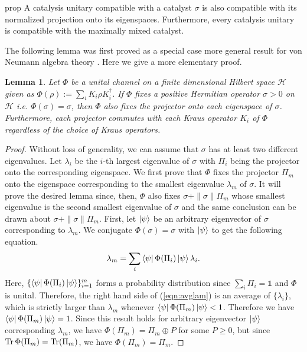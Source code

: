\documentclass[aps, reprint, amsmath,amssymb, prx, superscriptaddress]{revtex4-2}
\newtheorem{lemma}[theorem]{Lemma}
\begin{document}
\begin{theoremEnd}{prop} \label{prop:comp}
    A catalysis unitary compatible with a catalyst $\sigma$ is also compatible with its normalized projection onto its eigenspaces. Furthermore, every catalysis unitary is compatible with the maximally mixed catalyst.
\end{theoremEnd}
\begin{proofEnd}


 The following lemma was first proved as a special case more general result for von Neumann algebra theory \cite{arias2002fixed, lie2020uniform}. Here we give a more elementary proof.

\begin{lemma} \label{lem:unital}
Let $\Phi$ be a unital channel on a finite dimensional Hilbert space $\mathcal{H}$ given as $\Phi(\rho):=\sum_i K_i\rho K_i^\dag$. If $\Phi$ fixes a positive Hermitian operator $\sigma > 0$ on $\mathcal{H}$ i.e. $\Phi(\sigma)=\sigma$, then $\Phi$ also fixes the projector onto each eigenspace of $\sigma$. Furthermore, each projector commutes with each Kraus operator $K_i$ of $\Phi$ regardless of the choice of Kraus operators.
\end{lemma}
\begin{proof}
    Without loss of generality, we can assume that $\sigma$ has at least two different eigenvalues. Let $\lambda_i$ be the $i$-th largest eigenvalue of $\sigma$ with $\Pi_i$ being the projector onto the corresponding eigenspace. We first prove that $\Phi$ fixes the projector $\Pi_m$ onto the eigenspace corresponding to the smallest eigenvalue $\lambda_m$ of $\sigma$. It will prove the desired lemma since, then, $\Phi$ also fixes $\sigma+\|\sigma\|\Pi_m$ whose smallest eigenvalue is the second smallest eigenvalue of $\sigma$ and the same conclusion can be drawn about $\sigma+\|\sigma\|\Pi_m$.
    First, let $\ket{\psi}$ be an arbitrary eigenvector of $\sigma$ corresponding to $\lambda_m$. We conjugate $\Phi(\sigma)=\sigma$ with $\ket{\psi}$ to get the following equation.
    \begin{equation} \label{eqn:avglam}
        \lambda_m=\sum_i \bra{\psi}\Phi(\Pi_i)\ket{\psi}\lambda_i.
    \end{equation}
    Here, $\{\bra{\psi}\Phi(\Pi_i)\ket{\psi}\}_{i=1}^m$ forms a probability distribution since $\sum_i \Pi_i = \mathds{1}$ and $\Phi$ is unital. Therefore, the right hand side of (\ref{eqn:avglam}) is an average of $\{\lambda_i\}$, which is strictly larger than $\lambda_m$ whenever $\bra{\psi}\Phi(\Pi_m)\ket{\psi}<1$. Therefore we have $\bra{\psi}\Phi(\Pi_m)\ket{\psi}=1$. Since this result holds for arbitrary eigenvector $\ket{\psi}$ corresponding $\lambda_m$, we have $\Phi(\Pi_m)=\Pi_m \oplus P$ for some $P\geq 0$, but since $\Tr\Phi(\Pi_m)=\Tr(\Pi_m)$, we have $\Phi(\Pi_m)=\Pi_m$.
    

\end{proof}
\end{proofEnd}
\end{document}
